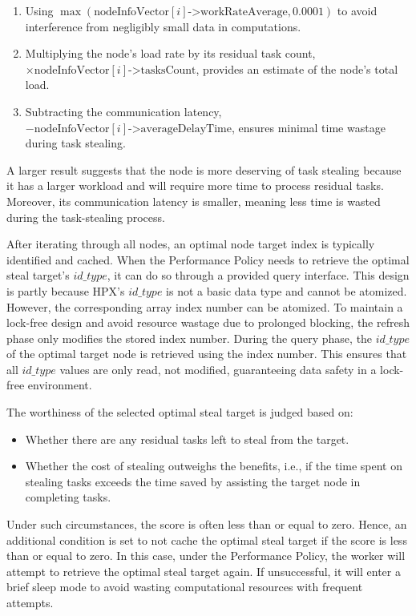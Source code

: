 \documentclass{mproj}
\begin{document}
\begin{enumerate}
    \item Using $\max\left(\text{nodeInfoVector}[i]\texttt{->}\text{workRateAverage}, 0.0001 \right)$ to avoid interference from negligibly small data in computations.
    \item Multiplying the node's load rate by its residual task count, $\times \text{nodeInfoVector}[i]\texttt{->}\text{tasksCount}$, provides an estimate of the node's total load.
    \item Subtracting the communication latency, $- \text{nodeInfoVector}[i]\texttt{->}\text{averageDelayTime}$, ensures minimal time wastage during task stealing.
\end{enumerate}

A larger result suggests that the node is more deserving of task stealing because it has a larger workload and will require more time to process residual tasks.
Moreover, its communication latency is smaller, meaning less time is wasted during the task-stealing process.

After iterating through all nodes, an optimal node target index is typically identified and cached.
When the Performance Policy needs to retrieve the optimal steal target's $id\_type$, it can do so through a provided query interface.
This design is partly because HPX's $id\_type$ is not a basic data type and cannot be atomized.
However, the corresponding array index number can be atomized.
To maintain a lock-free design and avoid resource wastage due to prolonged blocking, the refresh phase only modifies the stored index number.
During the query phase, the $id\_type$ of the optimal target node is retrieved using the index number.
This ensures that all $id\_type$ values are only read, not modified, guaranteeing data safety in a lock-free environment.

The worthiness of the selected optimal steal target is judged based on:
\begin{itemize}
    \item Whether there are any residual tasks left to steal from the target.
    \item Whether the cost of stealing outweighs the benefits, i.e., if the time spent on stealing tasks exceeds the time saved by assisting the target node in completing tasks.
\end{itemize}
Under such circumstances, the score is often less than or equal to zero.
Hence, an additional condition is set to not cache the optimal steal target if the score is less than or equal to zero.
In this case, under the Performance Policy, the worker will attempt to retrieve the optimal steal target again.
If unsuccessful, it will enter a brief sleep mode to avoid wasting computational resources with frequent attempts.
\end{document}
